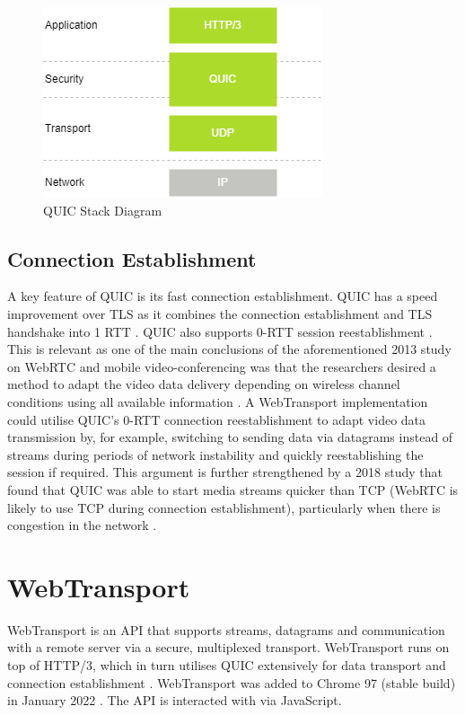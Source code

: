 \begin{figure}[h]
    \centering
    \includegraphics[width=0.5\columnwidth]{images/quic.png}
	\caption{QUIC Stack Diagram}
    \label{webrtc_connection_stack}
\end{figure}


\subsection{Connection Establishment}

A key feature of QUIC is its fast connection establishment. QUIC has a speed improvement over TLS as it combines the connection establishment and TLS handshake into 1 RTT \cite{rfc9000}. QUIC also supports 0-RTT session reestablishment \cite{quic-0rtt}. 
This is relevant as one of the main conclusions of the aforementioned 2013 study on WebRTC and mobile video-conferencing was that the researchers desired a method to adapt the video data delivery depending on wireless channel conditions using all available information \cite{fund2013}.  A WebTransport implementation could utilise QUIC's 0-RTT connection reestablishment to adapt video data transmission by, for example, switching to sending data via datagrams instead of streams during periods of network instability and quickly reestablishing the session if required. This argument is further strengthened by a 2018 study that found that QUIC was able to start media streams quicker than TCP (WebRTC is likely to use TCP during connection establishment), particularly when there is congestion in the network \cite{arisu2018}. 

\section{WebTransport}

WebTransport is an API that supports streams, datagrams and communication with a remote server via a secure, multiplexed transport. WebTransport runs on top of HTTP/3, which in turn utilises QUIC extensively for data transport and connection establishment \cite{vvv-webtransport-http3-03}. WebTransport was added to Chrome 97 (stable build) in January 2022 \cite{chrome97}. The API is interacted with via JavaScript.

